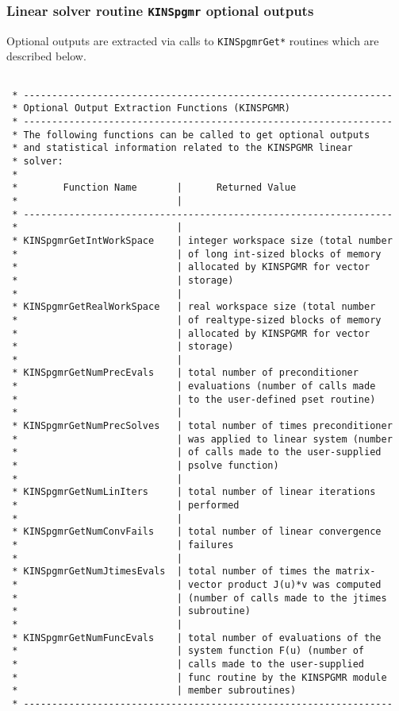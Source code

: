 \documentclass[11pt]{article}
\begin{document}
\subsubsection{Linear solver routine {\tt KINSpgmr} optional outputs}

Optional outputs are extracted via calls to {\tt KINSpgmrGet*} routines
which are described below.
\small
\begin{verbatim}

 * -----------------------------------------------------------------
 * Optional Output Extraction Functions (KINSPGMR)
 * -----------------------------------------------------------------
 * The following functions can be called to get optional outputs
 * and statistical information related to the KINSPGMR linear
 * solver:
 *
 *        Function Name       |      Returned Value
 *                            |
 * -----------------------------------------------------------------
 *                            |
 * KINSpgmrGetIntWorkSpace    | integer workspace size (total number
 *                            | of long int-sized blocks of memory
 *                            | allocated by KINSPGMR for vector
 *                            | storage)
 *                            |
 * KINSpgmrGetRealWorkSpace   | real workspace size (total number
 *                            | of realtype-sized blocks of memory
 *                            | allocated by KINSPGMR for vector
 *                            | storage)
 *                            |
 * KINSpgmrGetNumPrecEvals    | total number of preconditioner
 *                            | evaluations (number of calls made
 *                            | to the user-defined pset routine)
 *                            |
 * KINSpgmrGetNumPrecSolves   | total number of times preconditioner
 *                            | was applied to linear system (number
 *                            | of calls made to the user-supplied
 *                            | psolve function)
 *                            |
 * KINSpgmrGetNumLinIters     | total number of linear iterations
 *                            | performed
 *                            |
 * KINSpgmrGetNumConvFails    | total number of linear convergence
 *                            | failures
 *                            |
 * KINSpgmrGetNumJtimesEvals  | total number of times the matrix-
 *                            | vector product J(u)*v was computed
 *                            | (number of calls made to the jtimes
 *                            | subroutine)
 *                            |
 * KINSpgmrGetNumFuncEvals    | total number of evaluations of the
 *                            | system function F(u) (number of
 *                            | calls made to the user-supplied
 *                            | func routine by the KINSPGMR module
 *                            | member subroutines)
 * -----------------------------------------------------------------


\end{verbatim}
\end{document}
